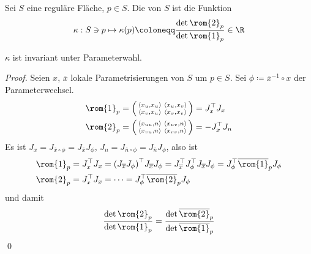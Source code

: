 \begin{definition}
  Sei \( S \) eine reguläre Fläche, \( p \in S \). Die \label{def:gaussKruemmung} von \( S \) ist die Funktion
  \begin{equation*}
    \kappa: S \ni p \mapsto \kappa(p) \coloneqq \frac{\det \rom{2}_p}{\det \rom{1}_p} \in \R
  \end{equation*}
\end{definition}

\begin{remark}
  \( \kappa \) ist invariant unter Parameterwahl.
  \begin{proof}
    Seien \( x \), \( \overline{x} \) lokale Parametrisierungen von \( S \) um \( p \in S \). Sei \( \phi \coloneqq \overline{x}^{-1} \circ x \) der Parameterwechsel.
    \begin{align*}
      \rom{1}_p &= \left( \begin{smallmatrix}
        \langle x_u,x_u \rangle & \langle x_u,x_v \rangle \\
        \langle x_v,x_u \rangle & \langle x_v,x_v \rangle
      \end{smallmatrix} \right) = J_x^\top J_x \\
      \rom{2}_p &= \left( \begin{smallmatrix}
        \langle x_{uu}, n \rangle & \langle x_{uv}, n \rangle \\ 
        \langle x_{vu}, n \rangle & \langle x_{vv}, n \rangle
      \end{smallmatrix} \right) = -J_x^\top J_n
    \end{align*}
    Es ist \( J_x = J_{\overline{x} \circ \phi} = J_{\overline{x}}J_\phi \), \( J_n = J_{\overline{n} \circ \phi} = J_{\overline{n}}J_\phi \), also ist
    \begin{align*}
      \rom{1}_p &= J_x^\top J_x = {(J_{\overline{x}}J_\phi)}^\top J_{\overline{x}}J_\phi = J_{\overline{x}}^\top J_\phi^\top J_{\overline{x}} J_\phi = J_\phi^\top \overline{\rom{1}}_p J_\phi \\
      \rom{2}_p &= J_x^\top J_x = \cdots = J_\phi^\top \overline{\rom{2}}_p J_\phi
    \end{align*}
    und damit
    \begin{equation*}
      \frac{\det \rom{2}_p}{\det \rom{1}_p} = \frac{\det \overline{\rom{2}}_p}{\det \overline{\rom{1}}_p}
    \end{equation*} \qed{}
  \end{proof}
\end{remark}

